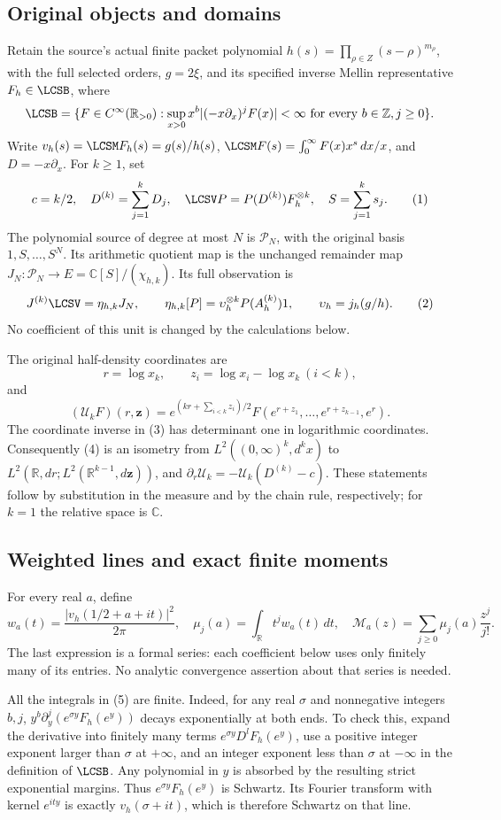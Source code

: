 \documentclass[10pt,a4paper,oneside]{report}
\begin{document}
\subsection{Original objects and domains}
Retain the source's actual finite packet polynomial
\(h(s)=\prod_{\rho\in Z}(s-\rho)^{m_\rho}\), with the full selected
orders, \(g=2\xi\), and its specified inverse Mellin representative
\(F_h\in\LCSB\), where
\[
 \LCSB=\{F\in C^\infty(\mathbb R_{>0}):
 \sup_{x>0}x^b|(-x\partial_x)^jF(x)|<\infty
 \text{ for every }b\in\mathbb Z,j\ge0\}.
\]
Write \(v_h(s)=\LCSM F_h(s)=g(s)/h(s)\),
\(\LCSM F(s)=\int_0^\infty F(x)x^s\,dx/x\), and
\(D=-x\partial_x\). For \(k\ge1\), set
\[
 c=k/2,\quad D^{(k)}=\sum_{j=1}^kD_j,\quad
 \LCSV P=P(D^{(k)})F_h^{\otimes k},\quad S=\sum_{j=1}^ks_j.
 \tag{1}
\]
The polynomial source of degree at most \(N\) is \(\mathcal P_N\),
with the original basis \(1,S,\ldots,S^N\). Its arithmetic quotient
map is the unchanged remainder map
\(J_N:\mathcal P_N\to E=\mathbb C[S]/(\chi_{h,k})\).
Its full observation is
\[
 J^{(k)}\LCSV=\eta_{h,k}J_N,\qquad
 \eta_{h,k}[P]=\upsilon_h^{\otimes k}P(A_h^{(k)})1,\qquad
 \upsilon_h=j_h(g/h).
 \tag{2}
\]
No coefficient of this unit is changed by the calculations below.

The original half-density coordinates are
\[
 r=\log x_k,\qquad z_i=\log x_i-\log x_k\ (i<k),
 \tag{3}
\]
and
\[
 (\mathcal U_kF)(r,\mathbf z)
 =e^{(kr+\sum_{i<k}z_i)/2}
 F(e^{r+z_1},\ldots,e^{r+z_{k-1}},e^r).
 \tag{4}
\]
The coordinate inverse in (3) has determinant one in logarithmic
coordinates. Consequently (4) is an isometry from
\(L^2((0,\infty)^k,d^kx)\) to
\(L^2(\mathbb R,dr;L^2(\mathbb R^{k-1},d\mathbf z))\), and
\(\partial_r\mathcal U_k=-\mathcal U_k(D^{(k)}-c)\).
These statements follow by substitution in the measure and by the chain
rule, respectively; for \(k=1\) the relative space is \(\mathbb C\).

\subsection{Weighted lines and exact finite moments}
For every real \(a\), define
\[
 w_a(t)=\frac{|v_h(1/2+a+it)|^2}{2\pi},\quad
 \mu_j(a)=\int_{\mathbb R}t^j w_a(t)\,dt,\quad
 \mathcal M_a(z)=\sum_{j\ge0}\mu_j(a)\frac{z^j}{j!}.
 \tag{5}
\]
The last expression is a formal series: each coefficient below uses
only finitely many of its entries. No analytic convergence assertion
about that series is needed.

All the integrals in (5) are finite. Indeed, for any real \(\sigma\)
and nonnegative integers \(b,j\),
\(y^b\partial_y^j(e^{\sigma y}F_h(e^y))\) decays exponentially at
both ends. To check this, expand the derivative into finitely many
terms \(e^{\sigma y}D^lF_h(e^y)\), use a positive integer exponent
larger than \(\sigma\) at \(+\infty\), and an integer exponent less
than \(\sigma\) at \(-\infty\) in the definition of \(\LCSB\).
Any polynomial in \(y\) is absorbed by the resulting strict
exponential margins. Thus \(e^{\sigma y}F_h(e^y)\) is Schwartz.
Its Fourier transform with kernel \(e^{ity}\) is exactly
\(v_h(\sigma+it)\), which is therefore Schwartz on that line.
\end{document}
